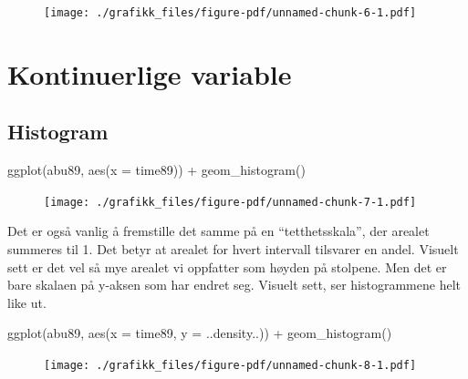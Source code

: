 \documentclass[
  letterpaper,
  DIV=11,
  numbers=noendperiod]{scrreprt}
\newenvironment{Shaded}{\begin{snugshade}}{\end{snugshade}}
\newcommand{\AttributeTok}[1]{\textcolor[rgb]{0.40,0.45,0.13}{#1}}
\newcommand{\FunctionTok}[1]{\textcolor[rgb]{0.28,0.35,0.67}{#1}}
\newcommand{\NormalTok}[1]{\textcolor[rgb]{0.00,0.23,0.31}{#1}}
\newcommand{\SpecialCharTok}[1]{\textcolor[rgb]{0.37,0.37,0.37}{#1}}
\theoremstyle{definition}
\theoremstyle{remark}
\begin{document}
\begin{figure}[H]

{\centering \texttt{[image: ./grafikk\_files/figure-pdf/unnamed-chunk-6-1.pdf]}

}

\end{figure}

\hypertarget{kontinuerlige-variable}{%
\section{Kontinuerlige variable}\label{kontinuerlige-variable}}

\hypertarget{histogram}{%
\subsection{Histogram}\label{histogram}}

\begin{Shaded}
\begin{Highlighting}[]
\FunctionTok{ggplot}\NormalTok{(abu89, }\FunctionTok{aes}\NormalTok{(}\AttributeTok{x =}\NormalTok{ time89)) }\SpecialCharTok{+}
  \FunctionTok{geom\_histogram}\NormalTok{()}
\end{Highlighting}
\end{Shaded}

\begin{figure}[H]

{\centering \texttt{[image: ./grafikk\_files/figure-pdf/unnamed-chunk-7-1.pdf]}

}

\end{figure}

Det er også vanlig å fremstille det samme på en ``tetthetsskala'', der
arealet summeres til 1. Det betyr at arealet for hvert intervall
tilsvarer en andel. Visuelt sett er det vel så mye arealet vi oppfatter
som høyden på stolpene. Men det er bare skalaen på y-aksen som har
endret seg. Visuelt sett, ser histogrammene helt like ut.

\begin{Shaded}
\begin{Highlighting}[]
\FunctionTok{ggplot}\NormalTok{(abu89, }\FunctionTok{aes}\NormalTok{(}\AttributeTok{x =}\NormalTok{ time89, }\AttributeTok{y =}\NormalTok{ ..density..)) }\SpecialCharTok{+}
  \FunctionTok{geom\_histogram}\NormalTok{()}
\end{Highlighting}
\end{Shaded}

\begin{figure}[H]

{\centering \texttt{[image: ./grafikk\_files/figure-pdf/unnamed-chunk-8-1.pdf]}

}

\end{figure}
\end{document}
